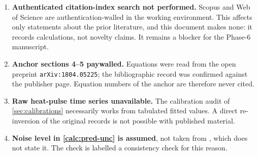 \documentclass[11pt,a4paper]{article}
\theoremstyle{definition}
\begin{document}
\begin{enumerate}[label=(B\arabic*)]
\item \textbf{Authenticated citation-index search not performed.} Scopus and
Web of Science are authentication-walled in the working environment. This
affects only statements about the prior literature, and this document makes
none: it records calculations, not novelty claims. It remains a blocker for the
Phase-6 manuscript.
\item \textbf{Anchor sections 4--5 paywalled.} Equations were read from the
open preprint \texttt{arXiv:1804.05225}; the bibliographic record was confirmed
against the publisher page. Equation numbers of the anchor are therefore never
cited.
\item \textbf{Raw heat-pulse time series unavailable.} The calibration audit of
\cref{sec:calibrations} necessarily works from tabulated fitted values. A
direct re-inversion of the original records is not possible with published
material.
\item \textbf{Noise level in \cref{calc:pred-unc} is assumed}, not taken from
\cite{Both2016}, which does not state it. The check is labelled a consistency
check for this reason.
\end{enumerate}



\end{document}

